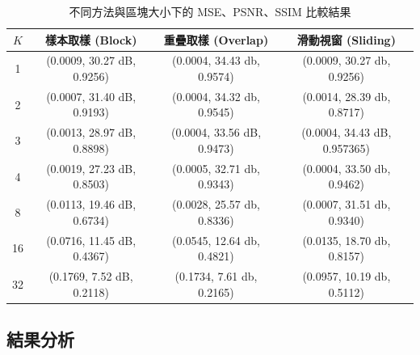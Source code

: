 \documentclass[a4paper,  10pt, oneside, fleqn]{article}
\begin{document}
\begin{table}[h]
    \centering
    \begin{tabular}{cccc}
        \hline
        $K$ & 樣本取樣 (Block)               & 重疊取樣 (Overlap)             & 滑動視窗 (Sliding)               \\
        \hline
        1   & (0.0009, 30.27 dB, 0.9256) & (0.0004, 34.43 db, 0.9574) & (0.0009, 30.27 db, 0.9256)   \\
        \hline
        2   & (0.0007, 31.40 dB, 0.9193) & (0.0004, 34.32 db, 0.9545) & (0.0014, 28.39 db, 0.8717)   \\
        \hline
        3   & (0.0013, 28.97 dB, 0.8898) & (0.0004, 33.56 dB, 0.9473) & (0.0004, 34.43 dB, 0.957365) \\
        \hline
        4   & (0.0019, 27.23 dB, 0.8503) & (0.0005, 32.71 db, 0.9343) & (0.0004, 33.50 db, 0.9462)   \\
        \hline
        8   & (0.0113, 19.46 dB, 0.6734) & (0.0028, 25.57 db, 0.8336) & (0.0007, 31.51 db, 0.9340)   \\
        \hline
        16  & (0.0716, 11.45 dB, 0.4367) & (0.0545, 12.64 db, 0.4821) & (0.0135, 18.70 db, 0.8157)   \\
        \hline
        32  & (0.1769,  7.52 dB, 0.2118) & (0.1734,  7.61 db, 0.2165) & (0.0957, 10.19 db, 0.5112)   \\
        \hline
    \end{tabular}
    \caption{不同方法與區塊大小下的 MSE、PSNR、SSIM 比較結果}
    \label{tab:results}
\end{table}


\subsection*{結果分析}
\end{document}
